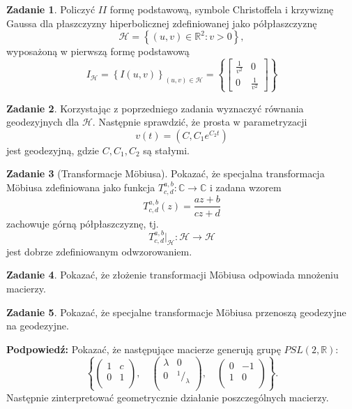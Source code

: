 \documentclass[a4paper,11pt]{article}
\theoremstyle{definition}\newtheorem{exercise}{Zadanie}
\theoremstyle{definition}\newtheorem{remark}{Uwaga}
\begin{document}
\begin{exercise}
 Policzyć $I\!I$ formę podstawową, symbole Christoffela i krzywiznę Gaussa dla 
płaszczyzny hiperbolicznej zdefiniowanej jako półpłaszczyznę 
\[\mathcal{H}=\left\{(u,v)\in \mathbb{R}^2\colon v>0 \right\},\] wyposażoną w 
pierwszą formę podstawową
\[I_{\mathcal{H}}=\left\{I(u,v)\right\}_{(u,v)\in 
\mathcal{H}}=\left\{\left[
\begin{array}{cc}
\frac{1}{v^2}&0\\
0 & \frac{1}{v^2}
\end{array}
\right]\right\}
\]

\end{exercise}

\begin{exercise}
 Korzystając z poprzedniego zadania wyznaczyć r\'ownania geodezyjnych dla 
$\mathcal{H}$. Następnie sprawdzić, że prosta w parametryzacji 
\[v(t)=\left(C,C_1 e^{C_2 t}\right)\] jest geodezyjną, gdzie $C, C_{1} , C_2$ 
są stałymi.
\end{exercise}


\begin{exercise}[Transformacje M\"obiusa]
Pokazać, że specjalna transformacja M\"obiusa zdefiniowana jako funkcja
$T^{a,b}_{c,d}\colon \mathbb{C}\to\mathbb{C}$ i zadana wzorem
\[T^{a,b}_{c,d}(z)= \frac{az+b}{cz+d}\]
zachowuje g\'orną p\'ołpłaszczyznę, tj.
\[T^{a,b}_{c,d}\Big|_{\mathcal{H}}\colon \mathcal{H}\to \mathcal{H}\]
jest dobrze zdefiniowanym odwzorowaniem.
\end{exercise}

\begin{exercise}
Pokazać, że złożenie transformacji M\"obiusa odpowiada mnożeniu macierzy.
\end{exercise}


\begin{exercise}
Pokazać, że specjalne transformacje M\"obiusa przenoszą geodezyjne na 
geodezyjne. 

\small{\textbf{Podpowiedź:} Pokazać, że następujące macierze 
generują grupę $PSL(2,\mathbb{R})$: 
\[\left\{\left(\begin{array}{cc}
     1 & c\\
	0 & 1\\
     \end{array}
\right),\quad \left(\begin{array}{cc}
     \lambda & 0\\
	0 & ^1\!\!\big/_{\!\!\lambda}\\
     \end{array}
\right),\quad\left(\begin{array}{cc}
     0& -1\\
	1 & 0\\
     \end{array}
\right)\right\}.\]
Następnie zinterpretować geometrycznie działanie poszczególnych macierzy.}
\end{exercise}
\end{document}
